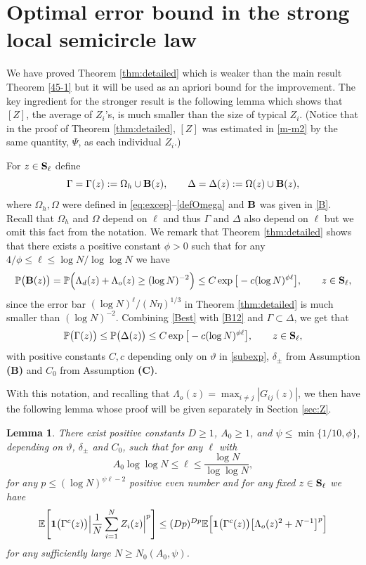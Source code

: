 \documentclass[draft]{article}
\newcommand{\ttau}{\vartheta}
\newcommand{\be}{\begin{equation}}
\newcommand{\ee}{\end{equation}}
\newcommand{\barZ}{ {[ Z ]}}
\newcommand{\E}{{\mathbb E }}
\renewcommand{\P}{{\mathbb P}}
\newcommand{\bS}{ {\bf  S}}
\newtheorem{lemma}[theorem]{Lemma}
\numberwithin{equation}{section}
\numberwithin{theorem}{section}
\numberwithin{definition}{section}
\numberwithin{remark}{section}
\begin{document}
\section{Optimal error bound in the strong local semicircle law}\label{sec:optimal}



We have proved Theorem \ref{thm:detailed} which is weaker than the main result Theorem \ref{45-1}
but it will be used as an apriori bound for the improvement.  
The key ingredient for the stronger result is the following lemma which shows that 
$\barZ$, the average of $Z_i$'s, is much smaller than 
the size of typical $Z_i$.
(Notice that in the proof of  Theorem \ref{thm:detailed}, 
$\barZ$ was estimated in \eqref{m-m2} by the same quantity,
 $\Psi$, as each individual $Z_i$.)

For $z\in \bS_\ell$ define  
\be
   \Gamma =\Gamma(z):=\Omega_h\cup {\bf B}(z),
\qquad \Delta=\Delta(z):=\Omega(z)\cup {\bf B}(z),
\label{defGamma}
\ee
where $\Omega_h, \Omega$ were defined in  \eqref{eq:excep}--\eqref{defOmega}
and ${\bf B}$ was given in  \eqref{B}.  Recall that $\Omega_h$ and $\Omega$ depend
on $\ell$ and thus $\Gamma$ and $\Delta$ also depend on $\ell$ but we omit this fact
from the notation.
We remark that 
Theorem \ref{thm:detailed}  shows that there exists a positive constant $\phi>0$ such that
for any $4/\phi\le\ell\le \log N/\log\log N$ we have 
\be
   \P \big( {\bf B}(z)\big) = \P \Big( \Lambda_d(z)+ \Lambda_o(z) \ge (\log N)^{-2}\Big)
  \le   C\exp{\big[-c(\log N)^{\phi \ell} \big]}, \qquad z\in \bS_\ell,
\label{Best}
\ee
since 
the error bar $(\log N)^\ell/(N\eta)^{1/3}$ in Theorem \ref{thm:detailed}
is much smaller than $(\log N)^{-2}$. 
Combining \eqref{Best} with \eqref{B12} and $\Gamma\subset\Delta$, we get
that 
\be
   \P \big( \Gamma(z) \big) \le \P \big( \Delta(z)\big)
\le  C\exp{\big[-c(\log N)^{\phi \ell} \big]}, \qquad z\in \bS_\ell,
\label{Gammaest}
\ee
with positive constants $C,c$ depending only on  $\ttau$ in \eqref{subexp},
$\delta_\pm$ from Assumption {\bf (B)} and  $C_0$ from
Assumption {\bf (C)}. 




With this notation, and recalling 
that $\Lambda_o(z)=\max_{i\ne j} |G_{ij}(z)|$, we then have the following
lemma whose proof will be given separately in Section  \ref{sec:Z}.


\begin{lemma}\label{motN} There exist positive constants $D\ge 1$, $A_0\ge 1$, 
 and $\psi \le \min\{ 1/10, \phi\}$,
depending on $\ttau$, $\delta_\pm$ and $C_0$,
 such that for any
$\ell$ with 
\be
    A_0\log\log N \le \ell \le \frac{\log N}{\log\log N},
\label{Lboud}
\ee
 for any  $p\le (\log N)^{\psi \ell-2}$ positive even number
 and
for any fixed $z\in\bS_\ell$   we have
\be\label{52}
\E \Bigg[ {\bf 1}\big(\Gamma^c(z)\big) \Big|\frac1N\sum_{i=1}^N Z_i(z)\Big|^{p} \Bigg]\leq
  (Dp)^{Dp} 
  \E \Big[{\bf 1}\big(\Gamma^c(z)\big)  \big[ \Lambda_o(z)^{2} + N^{-1}\big]^{p}\Big]
\ee
for any sufficiently large $N\ge N_0(A_0, \psi)$.
\end{lemma}
\end{document}
